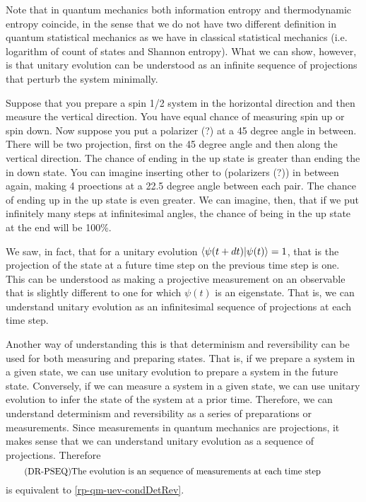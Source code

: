 Note that in quantum mechanics both information entropy and thermodynamic entropy coincide, in the sense that we do not have two different definition in quantum statistical mechanics as we have in classical statistical mechanics (i.e. logarithm of count of states and Shannon entropy). What we can show, however, is that unitary evolution can be understood as an infinite sequence of projections that perturb the system minimally.

Suppose that you prepare a spin 1/2 system in the horizontal direction and then measure the vertical direction. You have equal chance of measuring spin up or spin down. Now suppose you put a polarizer (?) at a 45 degree angle in between. There will be two projection, first on the 45 degree angle and then along the vertical direction. The chance of ending in the up state is greater than ending the in down state. You can imagine inserting other to (polarizers (?)) in between again, making 4 proections at a 22.5 degree angle between each pair. The chance of ending up in the up state is even greater. We can imagine, then, that if we put infinitely many steps at infinitesimal angles, the chance of being in the up state at the end will be 100\%.

We saw, in fact, that for a unitary evolution $\langle\psi(t+dt) | \psi(t)\rangle =1$, that is the projection of the state at a future time step on the previous time step is one. This can be understood as making a projective measurement on an observable that is slightly different to one for which $\psi(t)$ is an eigenstate. That is, we can understand unitary evolution as an infinitesimal sequence of projections at each time step.

Another way of understanding this is that determinism and reversibility can be used for both measuring and preparing states. That is, if we prepare a system in a given state, we can use unitary evolution to prepare a system in the future state. Conversely, if we can measure a system in a given state, we can use unitary evolution to infer the state of the system at a prior time. Therefore, we can understand determinism and reversibility as a series of preparations or measurements. Since measurements in quantum mechanics are projections, it makes sense that we can understand unitary evolution as a sequence of projections. Therefore 
\begin{equation}\label{rp-qm-uev-condProjectionSequence}
	\tag{DR-PSEQ}
	\eqtext{The evolution is an sequence of measurements at each time step} 
\end{equation}
is equivalent to \ref{rp-qm-uev-condDetRev}.


